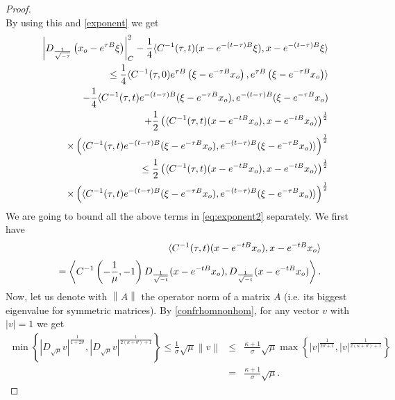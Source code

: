 \documentclass{amsart}
\numberwithin{equation}{section}
\begin{document}
{{\begin{proof}
$$ $$
 By using this and \eqref{exponent} we get
\begin{eqnarray}\label{eq:exponent2}
&&\left|D_{\frac{1}{\sqrt{-\tau}}}\left(x_{\rm o}-e^{\tau B}\xi\right)\right|_C^2-\frac{1}{4}\langle C^{-1}(\tau,t)(x-e^{-(t-\tau)B}\xi),x-e^{-(t-\tau)B}\xi\rangle\notag\\
 && \quad \leq  \frac{1}{4}\langle C^{-1}(\tau,0)e^{\tau B}\left(\xi - e^{-\tau B}x_{\rm o}\right),e^{\tau B}\left(\xi - e^{-\tau B}x_{\rm o}\right)\rangle \notag\\
 && \qquad -\frac{1}{4}\langle C^{-1}(\tau,t)e^{-(t-\tau)B}(\xi -e^{-\tau B}x_{\rm o}),e^{-(t-\tau)B}(\xi -e^{-\tau B}x_{\rm o})\notag\\
&& \qquad + \frac{1}{2}\left(\langle C^{-1}(\tau,t)(x-e^{-tB}x_{\rm o}),x-e^{-tB}x_{\rm o}\rangle\right)^\frac{1}{2}\notag\\
&& \qquad \times \left( \langle C^{-1}(\tau,t)e^{-(t-\tau)B}(\xi -e^{-\tau B}x_{\rm o}),e^{-(t-\tau)B}(\xi -e^{-\tau B}x_{\rm o})\rangle\right)^\frac{1}{2} \notag\\
&& \quad \leq \frac{1}{2}\left(\langle C^{-1}(\tau,t)(x-e^{-tB}x_{\rm o}),x-e^{-tB}x_{\rm o}\rangle\right)^\frac{1}{2}\\
&& \qquad \times \left( \langle C^{-1}(\tau,t)e^{-(t-\tau)B}(\xi -e^{-\tau B}x_{\rm o}),e^{-(t-\tau)B}(\xi -e^{-\tau B}x_{\rm o})\rangle\right)^\frac{1}{2}\notag
\end{eqnarray}
We are going to bound all the above terms in \eqref{eq:exponent2} separately. We first have
\begin{eqnarray*}
&& \langle C^{-1}(\tau,t)(x-e^{-tB}x_{\rm o}),x-e^{-tB}x_{\rm o}\rangle\\*[0.5ex]
&& \quad =\left\langle C^{-1}\left(-\frac{1}{\mu},-1\right)D_{\frac{1}{\sqrt{-t}}}(x-e^{-tB}x_{\rm o}),D_{\frac{1}{\sqrt{-t}}}(x-e^{-tB}x_{\rm o})\right\rangle.
\end{eqnarray*}
Now, let us denote with $\left\|A\right\|$ the operator norm of a matrix $A$ (i.e. its biggest eigenvalue for symmetric matrices). By \eqref{confrhomnonhom}, for any vector $v$ with $\left|v\right|=1$ we get
\begin{eqnarray*}
\min{\left\{\left|D_{\sqrt{\mu}}v\right|^\frac{1}{1+2\vartheta},\left|D_{\sqrt{\mu}}v\right|^{\frac{1}{2(\kappa+\vartheta)+1}}\right\}}\leq\frac{1}{\sigma}\sqrt{\mu}\left\|v\right\| & \leq & \frac{\kappa+1}{\sigma}\sqrt{\mu}\max{\left\{\left|v\right|^\frac{1}{2\vartheta+1},\left|v\right|^{\frac{1}{2(\kappa+\vartheta)+1}}\right\}}\\
& = & \frac{\kappa+1}{\sigma}\sqrt{\mu}.
\end{eqnarray*}


\end{proof}}}
\end{document}

